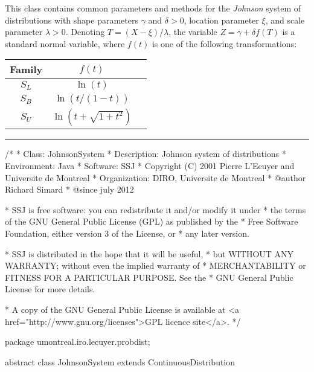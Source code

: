 
This class contains common parameters and methods for
the {\em Johnson} system of distributions \cite{tJOH49a,tJOH95a}
with shape parameters $\gamma$ and $\delta > 0$, location parameter $\xi$,
and scale parameter $\lambda>0$.
Denoting $T=(X-\xi)/\lambda$, the variable $Z = \gamma + \delta f(T)$
is a standard normal variable, where $f(t)$ is one of the following transformations:

\begin{center}
\begin{tabular}{|c|c|c|}
\hline
 Family  &  $f(t)$  \\
\hline
$S_L$   &  $\ln(t)$ \\
$S_B$   &  $\ln(t / (1-t))$ \\
$S_U$   &  $\ln(t + \sqrt{1 + t^2})$ \\
\hline
\end{tabular}
\end{center}


\bigskip\hrule

\begin{code}
\begin{hide}
/*
 * Class:        JohnsonSystem
 * Description:  Johnson system of distributions
 * Environment:  Java
 * Software:     SSJ
 * Copyright (C) 2001  Pierre L'Ecuyer and Universite de Montreal
 * Organization: DIRO, Universite de Montreal
 * @author       Richard Simard
 * @since        july 2012

 * SSJ is free software: you can redistribute it and/or modify it under
 * the terms of the GNU General Public License (GPL) as published by the
 * Free Software Foundation, either version 3 of the License, or
 * any later version.

 * SSJ is distributed in the hope that it will be useful,
 * but WITHOUT ANY WARRANTY; without even the implied warranty of
 * MERCHANTABILITY or FITNESS FOR A PARTICULAR PURPOSE.  See the
 * GNU General Public License for more details.

 * A copy of the GNU General Public License is available at
   <a href="http://www.gnu.org/licenses">GPL licence site</a>.
 */
\end{hide}
package umontreal.iro.lecuyer.probdist;


abstract class JohnsonSystem extends ContinuousDistribution\begin{hide} {
   protected double gamma;
   protected double delta;
   protected double xi;
   protected double lambda;\end{hide}
\end{code}


